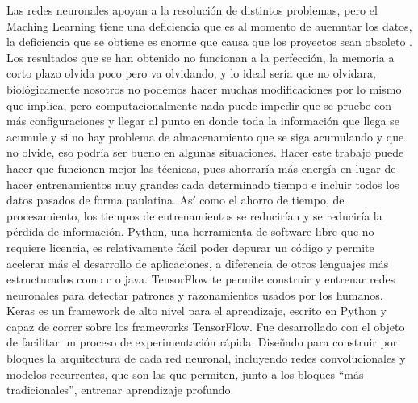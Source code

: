     Las redes neuronales apoyan a la resoluci\'on de distintos problemas, pero el Maching Learning tiene una deficiencia que es al momento de auemntar los datos, la deficiencia que se obtiene es enorme que causa que los proyectos sean obsoleto \cite{Bullinaria2009}. Los resultados que se han obtenido no funcionan a la perfección, la memoria a corto plazo olvida poco pero va olvidando,
    y lo ideal sería que no olvidara, biológicamente nosotros no podemos hacer muchas modificaciones \cite{TRAMONINEGRE2017} por lo mismo que implica, pero computacionalmente nada puede impedir que se pruebe con más configuraciones y llegar al punto en donde toda la información que llega se acumule y si no hay problema de almacenamiento que se siga acumulando y que no olvide, eso podría ser bueno en algunas situaciones.
    Hacer este trabajo puede hacer que funcionen mejor las técnicas, pues ahorraría más energía en lugar de hacer entrenamientos muy grandes cada determinado tiempo e incluir todos los datos pasados de forma paulatina. Así como el ahorro de tiempo, de procesamiento, los tiempos de entrenamientos se reducirían y se reduciría la pérdida de información.
    Python, una herramienta de software libre que no requiere licencia, es relativamente fácil poder depurar un código y permite acelerar más el desarrollo de aplicaciones,  a diferencia de otros lenguajes más estructurados como c o java.
    TensorFlow te permite construir y entrenar redes neuronales para detectar patrones y razonamientos usados por los humanos.
    Keras es un framework de alto nivel para el aprendizaje, escrito en Python y capaz de correr sobre los frameworks TensorFlow. Fue desarrollado con el objeto de facilitar un proceso de experimentación rápida. Diseñado para construir por bloques la arquitectura de cada red neuronal, incluyendo redes convolucionales y modelos recurrentes, que son las que permiten, junto a los bloques “más tradicionales”, entrenar aprendizaje profundo.